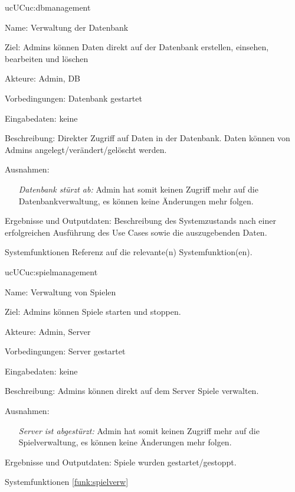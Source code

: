 \begin{description}[leftmargin=5em, style=sameline]
	\begin{lhp}{uc}{UC}{uc:dbmanagement}
		\item [Name:] Verwaltung der Datenbank
		\item [Ziel:] Admins können Daten direkt auf der Datenbank erstellen, einsehen, bearbeiten und löschen
		\item [Akteure:] Admin, DB
		\item [Vorbedingungen:] Datenbank gestartet
		\item [Eingabedaten:] keine
		\item [Beschreibung:] Direkter Zugriff auf Daten in der Datenbank. Daten können von Admins angelegt/verändert/gelöscht werden.
		\item [Ausnahmen:] \begin{itemize}
			\item[] \textit{Datenbank stürzt ab:} Admin hat somit keinen Zugriff mehr auf die Datenbankverwaltung, es können keine Änderungen mehr folgen.
		\end{itemize}
		\item [Ergebnisse und Outputdaten:] Beschreibung des Systemzustands nach einer erfolgreichen Ausführung des Use Cases sowie die auszugebenden Daten.
		\item [Systemfunktionen] Referenz auf die relevante(n) Systemfunktion(en).
	\end{lhp}

	\begin{lhp}{uc}{UC}{uc:spielmanagement}
		\item [Name:] Verwaltung von Spielen
		\item [Ziel:] Admins können Spiele starten und stoppen.
		\item [Akteure:] Admin, Server
		\item [Vorbedingungen:] Server gestartet
		\item [Eingabedaten:] keine
		\item [Beschreibung:] Admins können direkt auf dem Server Spiele verwalten.
		\item [Ausnahmen:] \begin{itemize}
			\item[] \textit{Server ist abgestürzt:} Admin hat somit keinen Zugriff mehr auf die Spielverwaltung, es können keine Änderungen mehr folgen.
		\end{itemize}
		\item [Ergebnisse und Outputdaten:] Spiele wurden gestartet/gestoppt.
		\item [Systemfunktionen] \ref{funk:spielverw}
	\end{lhp}


\end{description}
